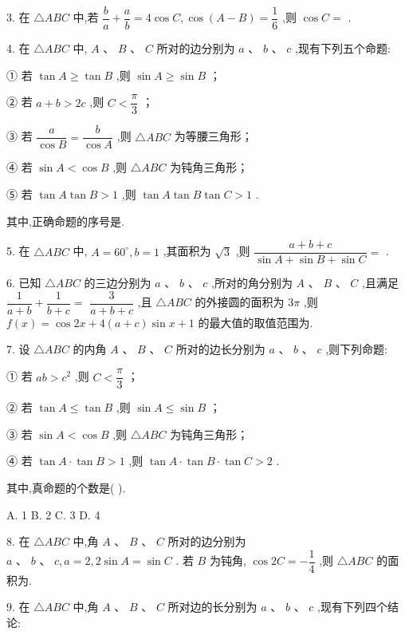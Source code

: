 3. 在 $\bigtriangleup  {ABC}$ 中,若 $\dfrac{b}{a} + \dfrac{a}{b} = 4\cos C,\cos \left( {A - B}\right)  = \dfrac{1}{6}$ ,则 $\cos C =$ \blkda{}.

4. 在 $\bigtriangleup {ABC}$ 中, $A\text{ 、 }B\text{ 、 }C$ 所对的边分别为 $a\text{ 、 }b\text{ 、 }c$ ,现有下列五个命题:

① 若 $\tan A \geq  \tan B$ ,则 $\sin A \geq  \sin B$ ；

② 若 $a + b > {2c}$ ,则 $C < \dfrac{\pi }{3}$ ；

③ 若 $\dfrac{a}{\cos B} = \dfrac{b}{\cos A}$ ,则 $\bigtriangleup  {ABC}$ 为等腰三角形；

④ 若 $\sin A < \cos B$ ,则 $\bigtriangleup  {ABC}$ 为钝角三角形；

⑤ 若 $\tan A\tan B > 1$ ,则 $\tan A\tan B\tan C > 1$ .

其中,正确命题的序号是\blkda{}.

5. 在 $\bigtriangleup {ABC}$ 中, $A = {60}^{ \circ  },b = 1$ ,其面积为 $\sqrt{3}$ ,则 $\dfrac{a + b + c}{\sin A + \sin B + \sin C} =$ \blkda{}.

6. 已知 $\bigtriangleup {ABC}$ 的三边分别为 $a\text{ 、 }b\text{ 、 }c$ ,所对的角分别为 $A\text{ 、 }B\text{ 、 }C$ ,且满足 $\dfrac{1}{a + b} + \dfrac{1}{b + c} =$  $\dfrac{3}{a + b + c}$ ,且 $\bigtriangleup {ABC}$ 的外接圆的面积为 ${3\pi }$ ,则 $f\left( x\right)  = \cos {2x} + 4\left( {a + c}\right) \sin x + 1$ 的最大值的取值范围为\blkda{}.

7. 设 $\bigtriangleup {ABC}$ 的内角 $A\text{ 、 }B\text{ 、 }C$ 所对的边长分别为 $a\text{ 、 }b\text{ 、 }c$ ,则下列命题:

① 若 ${ab} > {c}^{2}$ ,则 $C < \dfrac{\pi }{3}$ ；

② 若 $\tan A \leq  \tan B$ ,则 $\sin A \leq  \sin B$ ；

③ 若 $\sin A < \cos B$ ,则 $\bigtriangleup  {ABC}$ 为钝角三角形；

④ 若 $\tan A \cdot  \tan B > 1$ ,则 $\tan A \cdot  \tan B \cdot  \tan C > 2$ .

其中,真命题的个数是(   ).

A. 1 B. 2 C. 3 D. 4

8. 在 $\bigtriangleup {ABC}$ 中,角 $A\text{ 、 }B\text{ 、 }C$ 所对的边分别为 $a\text{ 、 }b\text{ 、 }c,a = 2,2\sin A = \sin C$ . 若 $B$ 为钝角, $\cos {2C} =  - \dfrac{1}{4}$ ,则 $\bigtriangleup  {ABC}$ 的面积为\blkda{}.

9. 在 $\bigtriangleup {ABC}$ 中,角 $A\text{ 、 }B\text{ 、 }C$ 所对边的长分别为 $a\text{ 、 }b\text{ 、 }c$ ,现有下列四个结论:

